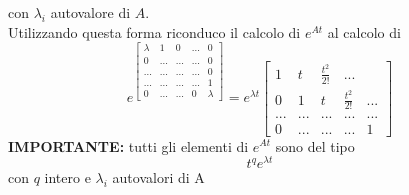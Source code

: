 \documentclass{article}
\numberwithin{equation}{subsection}
\begin{document}
con $\lambda_i$ autovalore di $A$.
\vspace*{0.2cm}\\
Utilizzando questa forma riconduco il calcolo di $e^{At}$ al calcolo di 
\begin{equation}
    e^{
        \begin{bmatrix} 
            \lambda & 1 & 0 & ... & 0\\
            0 & ... & ... & ... &0\\
            ... & ... & ... & ... & 0\\
            ... & ... & ... & ... & 1\\
            0 & ... & ... & 0 & \lambda
        \end{bmatrix}
        }
        = e^{\lambda t}
        \begin{bmatrix}
            1 & t & \frac{t^2}{2!} & ... \\
            0 & 1 & t & \frac{t^2}{2!} & ... \\
            ... & ... & ... & ... & ...\\
            0 & ... & ... & ... & 1
        \end{bmatrix}
\end{equation}
\textbf{IMPORTANTE:} tutti gli elementi di $e^{At}$ sono del tipo
\begin{equation}
    t^qe^{\lambda t}
\end{equation}
con $q$ intero e $\lambda_i$ autovalori di A
\end{document}
